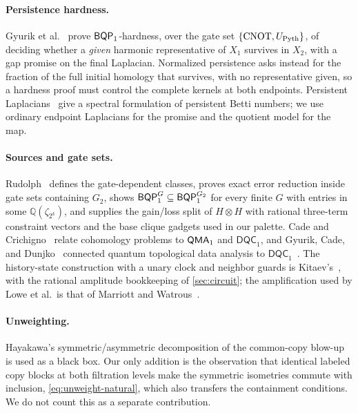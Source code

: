 \paragraph{Persistence hardness.}
Gyurik et al.~\cite{gyurik2026provable} prove \(\mathsf{BQP}_{1}\)-hardness, over the
gate set \(\{\mathrm{CNOT},U_{\rm Pyth}\}\), of deciding whether a
\emph{given} harmonic representative of \(X_1\) survives in \(X_2\), with a
gap promise on the final Laplacian.  Normalized persistence asks instead for
the fraction of the full initial homology that survives, with no
representative given, so a hardness proof must control the complete kernels
at both endpoints.  Persistent Laplacians~\cite{memoli2022persistent} give a
spectral formulation of persistent Betti numbers; we use ordinary endpoint
Laplacians for the promise and the quotient model for the map.

\paragraph{Sources and gate sets.}
Rudolph~\cite{rudolph2026universal} defines the gate-dependent classes,
proves exact error reduction inside gate sets containing \(G_2\), shows
\(\mathsf{BQP}_{1}^{G}\subseteq\mathsf{BQP}_{1}^{G_2}\) for every finite \(G\) with entries in
some \(\mathbb Q(\zeta_{2^k})\), and supplies the gain/loss split of
\(H\otimes H\) with rational three-term constraint vectors and the base
clique gadgets used in our palette.  Cade and
Crichigno~\cite{cade2024complexity} relate cohomology problems to
\(\mathsf{QMA}_{1}\) and \(\mathsf{DQC}_1\), and Gyurik, Cade, and
Dunjko~\cite{gyurik2022towards} connected quantum topological data analysis
to \(\mathsf{DQC}_1\)~\cite{knill1998power}.  The history-state construction
with a unary clock and neighbor guards is
Kitaev's~\cite{kitaev2002classical,kempe2006complexity}, with the rational
amplitude bookkeeping of \cref{sec:circuit}; the amplification used by Lowe
et al.\ is that of Marriott and Watrous~\cite{marriott2005quantum}.

\paragraph{Unweighting.}
Hayakawa's symmetric/asymmetric decomposition of the common-copy
blow-up~\cite[Lemma~4.2 and Theorem~4.3]{hayakawa2026unweighted} is used as a
black box.  Our only addition is the observation that identical labeled copy
blocks at both filtration levels make the symmetric isometries commute with
inclusion, \cref{eq:unweight-natural}, which also transfers the containment
conditions.  We do not count this as a separate contribution.
